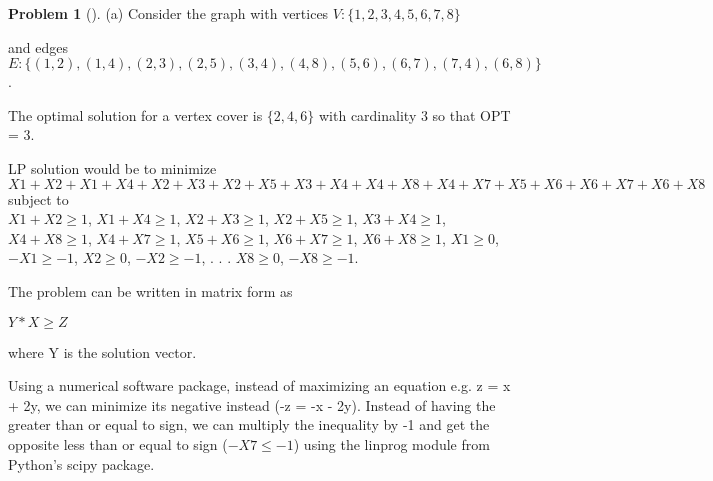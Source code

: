 \documentclass[11pt,twoside]{article}
\theoremstyle{definition}
\newtheorem{amsproblem}{Problem}
\newenvironment{problem}[1][]{%
  \begin{amsproblem}[#1]
  }{%
  \end{amsproblem}
}
\begin{document}
\begin{problem}  
\par (a) Consider the graph with vertices $V : \{1,2,3,4,5,6,7,8\} $ 

and edges $E : \{(1,2),(1,4),(2,3),(2,5),(3,4),(4,8),(5,6),(6,7),(7,4),(6,8)\} $. 


The optimal solution for a vertex cover is $\{2,4,6\}$ with cardinality 3 so that OPT = 3.

LP solution would be to minimize  
$ X1 + X2 + X1 + X4 + X2 + X3 + X2 + X5 + X3 + X4 + X4 + X8 + X4 + X7 + X5 + X6 + X6 + X7 + X6 + X8 $ \\
subject to  \\

$ X1 + X2 \ge 1 $, 
$ X1 + X4 \ge 1 $, 
$ X2 + X3 \ge 1 $, 
$ X2 + X5 \ge 1 $, 
$ X3 + X4 \ge 1 $, 
$ X4 + X8 \ge 1 $, 
$ X4 + X7 \ge 1 $, 
$ X5 + X6 \ge 1 $, 
$ X6 + X7 \ge 1 $, 
$ X6 + X8 \ge 1 $, 
$ X1 \ge 0 $, 
$ -X1 \ge -1 $, 
$ X2 \ge 0 $, 
$ -X2 \ge -1 $, 
.
.
.
$ X8 \ge 0 $, 
$ -X8 \ge -1 $.

The problem can be written in matrix form as

$ Y * X \ge Z $

where Y is the solution vector.

Using a numerical software package, instead of maximizing an equation e.g. z = x + 2y, we can minimize its negative instead (-z = -x - 2y).
Instead of having the greater than or equal to sign, we can multiply the inequality by -1 and get the opposite less than or equal to sign ($ -X7 \le -1 $) using the linprog module from Python's scipy package.


\end{problem}
\end{document}
